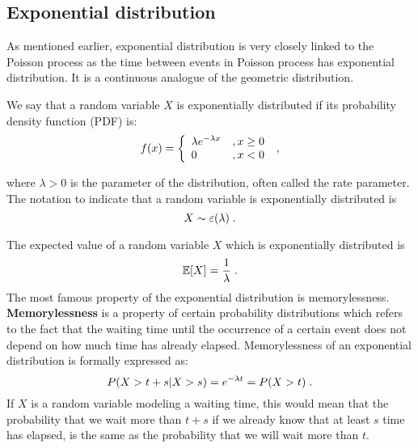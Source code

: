 \documentclass[times, utf8, diplomski]{fer}
\begin{document}
		\subsection{Exponential distribution}
		As mentioned earlier, exponential distribution is very closely linked to the Poisson process as the time between events in Poisson process has exponential distribution. It is a continuous analogue of the geometric distribution.
			\begin{definition}
			\label{exponential}
			We say that a random variable $X$ is exponentially distributed if its probability density function (PDF) is:
			\begin{equation}
				f(x) = \left\{ \begin{array}{lc} \lambda e^{-\lambda x} &, x \geq 0 \\
												0 &, x < 0 \end{array}\right. \hspace{0.1cm},
			\end{equation}

			\noindent where $\lambda > 0$ is the parameter of the distribution, often called the rate parameter. The notation to indicate that a random variable is exponentially distributed is $$X \sim \varepsilon(\lambda) \hspace{0.1cm}.$$
			\end{definition}

			\noindent The expected value of a random variable $X$ which is exponentially distributed is \begin{equation} \mathbb{E}[X] = \frac{1}{\lambda} \hspace{0.1cm}.\end{equation} The most famous property of the exponential distribution is memorylessness. \textbf{Memorylessness} is a property of certain probability distributions which refers to the fact that the waiting time until the occurrence of a certain event does not depend on how much time has already elapsed. Memorylessness of an exponential distribution is formally expressed as: \begin{equation} P(X > t + s | X>s) = e^{-\lambda t} = P(X > t) \hspace{0.1cm}.\end{equation} If $X$ is a random variable modeling a waiting time, this would mean that the probability that we wait more than $t+s$ if we already know that at least $s$ time has elapsed, is the same as the probability that we will wait more than $t$. 
\end{document}
